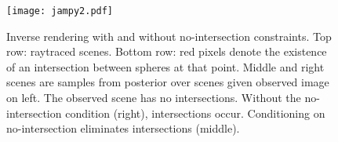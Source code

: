 \begin{figure}
	\centering
	\texttt{[image: jampy2.pdf]}
	\caption{Inverse rendering with and without no-intersection constraints.  Top row: raytraced scenes.  Bottom row: red pixels denote the existence of an intersection between spheres at that point.  Middle and right scenes are samples from posterior over scenes given observed image on left.  The observed scene has no intersections.  Without the no-intersection condition (right), intersections occur.  Conditioning on no-intersection eliminates intersections (middle).}
	\label{fig:invrtmcmc}
	\vspace{-1em}
\end{figure}





